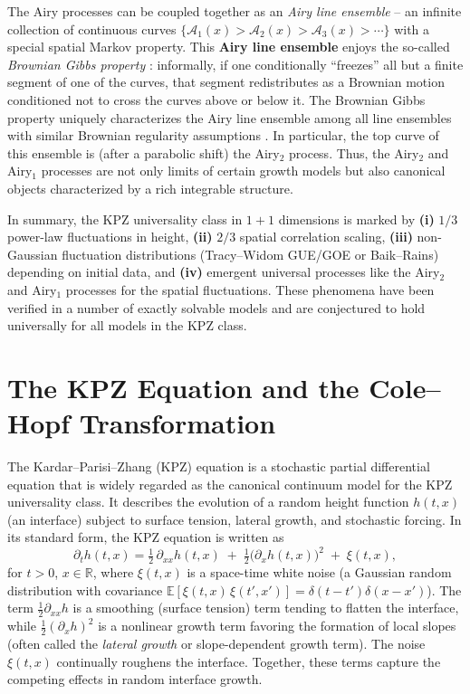 \documentclass[letterpaper,11pt,oneside,reqno]{article}
\numberwithin{equation}{section}
\theoremstyle{definition}
\begin{document}
The Airy processes can be coupled together as an \emph{Airy line ensemble} -- an infinite collection of continuous curves $\{\mathcal{A}_1(x) > \mathcal{A}_2(x) > \mathcal{A}_3(x) > \cdots\}$ with a special spatial Markov property. This \textbf{Airy line ensemble} enjoys the so-called \emph{Brownian Gibbs property} \cite{CorwinHammond2013}: informally, if one conditionally ``freezes'' all but a finite segment of one of the curves, that segment redistributes as a Brownian motion conditioned not to cross the curves above or below it. The Brownian Gibbs property uniquely characterizes the Airy line ensemble among all line ensembles with similar Brownian regularity assumptions \cite{AggarwalHuang2023Characterization}. In particular, the top curve of this ensemble is (after a parabolic shift) the Airy$_2$ process. Thus, the Airy$_2$ and Airy$_1$ processes are not only limits of certain growth models but also canonical objects characterized by a rich integrable structure.

In summary, the KPZ universality class in $1+1$ dimensions is marked by \textbf{(i)} $1/3$ power-law fluctuations in height, \textbf{(ii)} $2/3$ spatial correlation scaling, \textbf{(iii)} non-Gaussian fluctuation distributions (Tracy--Widom GUE/GOE or Baik--Rains) depending on initial data, and \textbf{(iv)} emergent universal processes like the Airy$_2$ and Airy$_1$ processes for the spatial fluctuations. These phenomena have been verified in a number of exactly solvable models and are conjectured to hold universally for all models in the KPZ class.

\section{The KPZ Equation and the Cole--Hopf Transformation}
The Kardar–Parisi–Zhang (KPZ) equation is a stochastic partial differential equation that is widely regarded as the canonical continuum model for the KPZ universality class. It describes the evolution of a random height function $h(t,x)$ (an interface) subject to surface tension, lateral growth, and stochastic forcing. In its standard form, the KPZ equation is written as
\begin{equation}\label{eq:KPZ}
\partial_t h(t,x) = \tfrac{1}{2}\,\partial_{xx} h(t,x)\;+\; \tfrac{1}{2}\big(\partial_x h(t,x)\big)^2 \;+\; \xi(t,x),
\end{equation}
for $t>0$, $x\in\mathbb{R}$, where $\xi(t,x)$ is a space-time white noise (a Gaussian random distribution with covariance $\mathbb{E}[\xi(t,x)\,\xi(t',x')] = \delta(t-t')\delta(x-x')$). The term $\frac{1}{2}\partial_{xx}h$ is a smoothing (surface tension) term tending to flatten the interface, while $\frac{1}{2}(\partial_x h)^2$ is a nonlinear growth term favoring the formation of local slopes (often called the \emph{lateral growth} or slope-dependent growth term). The noise $\xi(t,x)$ continually roughens the interface. Together, these terms capture the competing effects in random interface growth.
\end{document}
